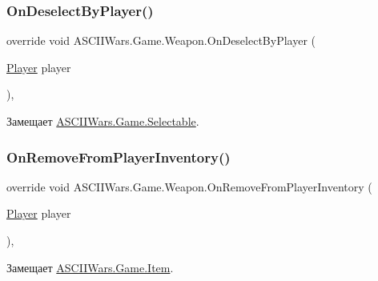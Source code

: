 \subsubsection{\texorpdfstring{On\+Deselect\+By\+Player()}{OnDeselectByPlayer()}}
{\footnotesize\ttfamily override void A\+S\+C\+I\+I\+Wars.\+Game.\+Weapon.\+On\+Deselect\+By\+Player (\begin{DoxyParamCaption}\item[{\hyperlink{class_a_s_c_i_i_wars_1_1_game_1_1_player}{Player}}]{player }\end{DoxyParamCaption})\hspace{0.3cm}{\ttfamily [inline]}, {\ttfamily [virtual]}}



Замещает \hyperlink{class_a_s_c_i_i_wars_1_1_game_1_1_selectable_a08a30c8786367bf45355e989b109c44b}{A\+S\+C\+I\+I\+Wars.\+Game.\+Selectable}.

\hypertarget{class_a_s_c_i_i_wars_1_1_game_1_1_weapon_a1fc9edec1d3881aee188a30ddc8f9e58}{}\label{class_a_s_c_i_i_wars_1_1_game_1_1_weapon_a1fc9edec1d3881aee188a30ddc8f9e58} 
\subsubsection{\texorpdfstring{On\+Remove\+From\+Player\+Inventory()}{OnRemoveFromPlayerInventory()}}
{\footnotesize\ttfamily override void A\+S\+C\+I\+I\+Wars.\+Game.\+Weapon.\+On\+Remove\+From\+Player\+Inventory (\begin{DoxyParamCaption}\item[{\hyperlink{class_a_s_c_i_i_wars_1_1_game_1_1_player}{Player}}]{player }\end{DoxyParamCaption})\hspace{0.3cm}{\ttfamily [inline]}, {\ttfamily [virtual]}}



Замещает \hyperlink{class_a_s_c_i_i_wars_1_1_game_1_1_item_a52412546f837bfc65a3aa9d728fa142f}{A\+S\+C\+I\+I\+Wars.\+Game.\+Item}.

\hypertarget{class_a_s_c_i_i_wars_1_1_game_1_1_weapon_a6cd549ad51fa64884a66b1083098465f}{}\label{class_a_s_c_i_i_wars_1_1_game_1_1_weapon_a6cd549ad51fa64884a66b1083098465f} 
